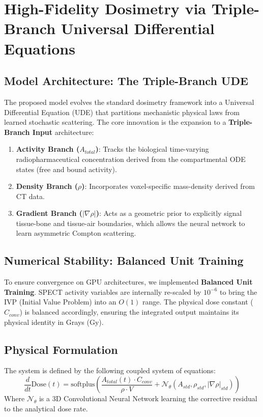 \documentclass[a4paper,10pt]{elsarticle}
\begin{document}
\begin{table}[H]
\begin{tabular}{|l|l|c|c|}
\end{tabular}
\end{table}


\section{High-Fidelity Dosimetry via Triple-Branch Universal Differential Equations}

\subsection{Model Architecture: The Triple-Branch UDE}
The proposed model evolves the standard dosimetry framework into a Universal Differential Equation (UDE) that partitions mechanistic physical laws from learned stochastic scattering. The core innovation is the expansion to a \textbf{Triple-Branch Input} architecture:
\begin{enumerate}
    \item \textbf{Activity Branch ($A_{total}$)}: Tracks the biological time-varying radiopharmaceutical concentration derived from the compartmental ODE states (free and bound activity).
    \item \textbf{Density Branch ($\rho$)}: Incorporates voxel-specific mass-density derived from CT data.
    \item \textbf{Gradient Branch ($|\nabla \rho|$)}: Acts as a geometric prior to explicitly signal tissue-bone and tissue-air boundaries, which allows the neural network to learn asymmetric Compton scattering.
\end{enumerate}

\subsection{Numerical Stability: Balanced Unit Training}
To ensure convergence on GPU architectures, we implemented \textbf{Balanced Unit Training}. SPECT activity variables are internally re-scaled by $10^{-6}$ to bring the IVP (Initial Value Problem) into an $O(1)$ range. The physical dose constant ($C_{conv}$) is balanced accordingly, ensuring the integrated output maintains its physical identity in Grays (Gy).

\subsection{Physical Formulation}
The system is defined by the following coupled system of equations:
\begin{equation}
    \frac{d}{dt} \text{Dose}(t) = \text{softplus} \left( \frac{A_{total}(t) \cdot C_{conv}}{\rho \cdot V} + \mathcal{N}_\theta(A_{std}, \rho_{std}, |\nabla \rho|_{std}) \right)
\end{equation}
Where $\mathcal{N}_\theta$ is a 3D Convolutional Neural Network learning the corrective residual to the analytical dose rate. 
\end{document}
